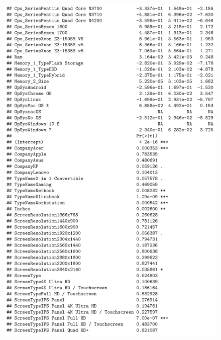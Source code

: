 \documentclass[12pt]{article}
\begin{document}
\begin{figure}[h!]
    \centering
    \includegraphics{Model_2_Sum(3_3).png}
    \label{fig:SUM23}
\end{figure}
\end{document}
